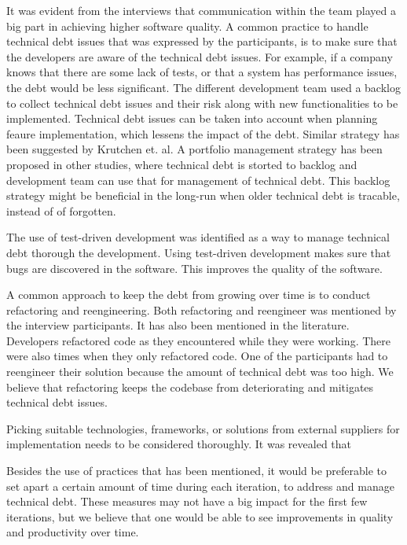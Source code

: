 It was evident from the interviews that communication within the team played a big part in achieving higher software quality. A common practice to handle technical debt issues that was expressed by the participants, is to make sure that the developers are aware of the technical debt issues. For example, if a company knows that there are some lack of tests, or that a system has performance issues, the debt would be less significant. The different development team used a backlog to collect technical debt issues and their risk along with new functionalities to be implemented. Technical debt issues can be taken into account when planning feaure implementation, which lessens the impact of the debt. Similar strategy has been suggested by Krutchen et. al\cite{krutchen}. A portfolio management strategy has been proposed in other studies, where technical debt is storted to backlog and development team can use that for management of technical debt. This backlog strategy might be beneficial in the long-run when older technical debt is tracable, instead of of forgotten.

The use of test-driven development was identified as a way to manage technical debt thorough the development. Using test-driven development makes sure that bugs are discovered in the software. This improves the quality of the software.

A common approach to keep the debt from growing over time is to conduct refactoring and reengineering. Both refactoring and reengineer was mentioned by the interview participants. It has also been mentioned in the literature. Developers refactored code as they encountered while they were working. There were also times when they only refactored code. One of the participants had to reengineer their solution because the amount of technical debt was too high. We believe that refactoring keeps the codebase from deteriorating and mitigates technical debt issues.

Picking suitable technologies, frameworks, or solutions from external suppliers for implementation needs to be considered thoroughly. It was revealed that 

Besides the use of practices that has been mentioned, it would be preferable to set apart a certain amount of time during each iteration, to address and manage technical debt. These measures may not have a big impact for the first few iterations, but we believe that one would be able to see improvements in quality and productivity over time.

